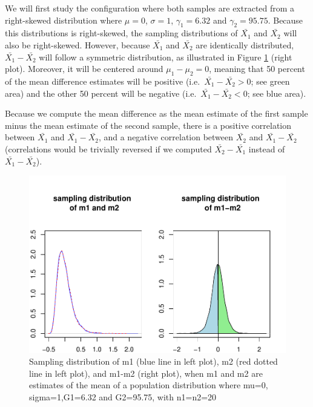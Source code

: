 \documentclass[
  man,floatsintext]{apa6}
\begin{document}
We will first study the configuration where both samples are extracted from a right-skewed distribution where \(\mu=0\), \(\sigma=1\), \(\gamma_1=6.32\) and \(\gamma_2=95.75\). Because this distributions is right-skewed, the sampling distributions of \(\bar{X_1}\) and \(\bar{X_2}\) will also be right-skewed. However, because \(\bar{X_1}\) and \(\bar{X_2}\) are identically distributed, \(\bar{X_1}-\bar{X_2}\) will follow a symmetric distribution, as illustrated in Figure \ref{fig:sampldist1} (right plot). Moreover, it will be centered around \(\mu_1-\mu_2=0\), meaning that 50 percent of the mean difference estimates will be positive (i.e.~\(\bar{X_1}-\bar{X_2} > 0\); see green area) and the other 50 percent will be negative (i.e.~\(\bar{X_1}-\bar{X_2} < 0\); see blue area).

Because we compute the mean difference as the mean estimate of the first sample minus the mean estimate of the second sample, there is a positive correlation between \(\bar{X_1}\) and \(\bar{X_1}-\bar{X_2}\), and a negative correlation between \(\bar{X_2}\) and \(\bar{X_1}-\bar{X_2}\) (correlations would be trivially reversed if we computed \(\bar{X_2}-\bar{X_1}\) instead of \(\bar{X_1}-\bar{X_2}\)).

\begin{figure}
\centering
\includegraphics{Mathematical-study-of-Glass-s-d_files/figure-latex/sampldist1-1.pdf}
\caption{\label{fig:sampldist1}Sampling distribution of m1 (blue line in left plot), m2 (red dotted line in left plot), and m1-m2 (right plot), when m1 and m2 are estimates of the mean of a population distribution where mu=0, sigma=1,G1=6.32 and G2=95.75, with n1=n2=20}
\end{figure}
\end{document}
